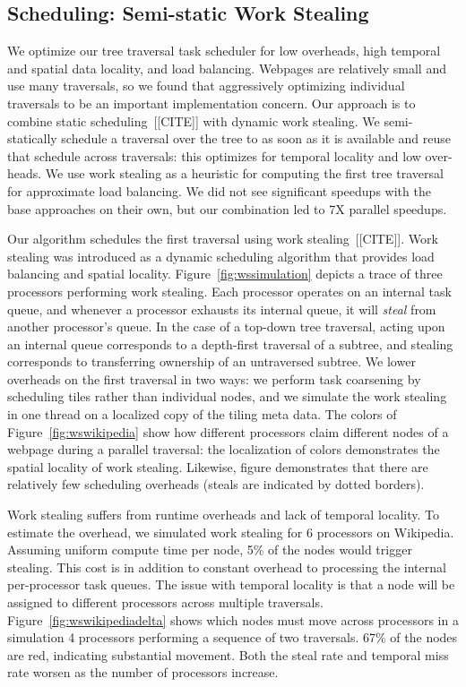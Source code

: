 \subsection{Scheduling: Semi-static Work Stealing}
We optimize our tree traversal task scheduler for low overheads, high temporal and spatial data locality, and load balancing. Webpages are relatively small and use many traversals, so we found that aggressively optimizing individual traversals to be an important implementation concern. Our approach is to combine static scheduling~[[CITE]] with dynamic work stealing. We semi-statically schedule a traversal over the tree to as soon as it is available and reuse that schedule across traversals: this optimizes for temporal locality and low over-heads. We use work stealing as a heuristic for computing the first tree traversal for approximate load balancing.  We did not see significant speedups with the base approaches on their own, but our combination led to 7X parallel speedups. 


Our algorithm schedules the first traversal using work stealing~[[CITE]]. Work stealing was introduced as a dynamic scheduling algorithm that provides load balancing and spatial locality. Figure~\ref{fig:wssimulation} depicts a trace of three processors performing work stealing. Each processor operates on an internal task queue, and whenever a processor exhausts its internal queue, it will \emph{steal} from another processor's queue. In the case of a top-down tree traversal, acting upon an internal queue corresponds to a depth-first traversal of a subtree, and stealing corresponds to transferring ownership of an untraversed subtree. We lower overheads on the first traversal in two ways: we perform task coarsening by scheduling tiles rather than individual nodes, and we simulate the work stealing in one thread on a localized copy of the tiling meta data. The colors of Figure~\ref{fig:wswikipedia} show how different processors claim different nodes of a webpage during a parallel traversal: the localization of colors demonstrates the spatial locality of work stealing. Likewise, figure demonstrates that there are relatively few scheduling overheads (steals are indicated by dotted borders).

Work stealing suffers from runtime overheads and lack of temporal locality. To estimate the overhead, we simulated work stealing for 6 processors on Wikipedia. Assuming uniform compute time per node, 5\% of the nodes would trigger stealing. This cost is in addition to constant overhead to processing the internal per-processor task queues. The issue with temporal locality is that a node will be assigned to different processors across multiple traversals. Figure~\ref{fig:wswikipediadelta} shows which nodes must move across processors in a simulation 4 processors performing a sequence of  two traversals. 67\% of the nodes are red, indicating substantial movement. Both the steal rate and temporal miss rate worsen as the number of processors increase.


